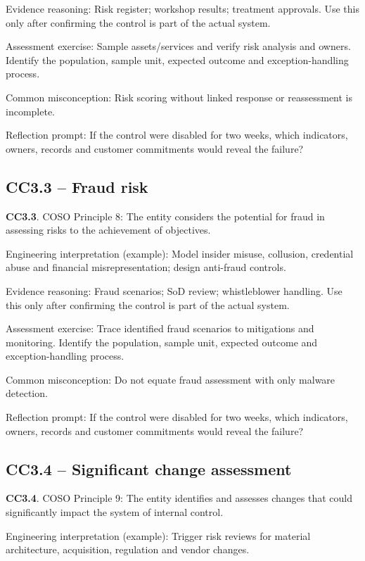 \documentclass[10pt,oneside]{report}
\begin{document}
Evidence reasoning: Risk register; workshop results; treatment approvals. Use this only after confirming the control is part of the actual system.

Assessment exercise: Sample assets/services and verify risk analysis and owners. Identify the population, sample unit, expected outcome and exception-handling process.

Common misconception: Risk scoring without linked response or reassessment is incomplete.

Reflection prompt: If the control were disabled for two weeks, which indicators, owners, records and customer commitments would reveal the failure?

\subsection{CC3.3 -- Fraud risk}
\begin{aicpabox}
\textbf{CC3.3}. COSO Principle 8: The entity considers the potential for fraud in assessing risks to the achievement of objectives.\par{}
\end{aicpabox}
Engineering interpretation (example): Model insider misuse, collusion, credential abuse and financial misrepresentation; design anti-fraud controls.

Evidence reasoning: Fraud scenarios; SoD review; whistleblower handling. Use this only after confirming the control is part of the actual system.

Assessment exercise: Trace identified fraud scenarios to mitigations and monitoring. Identify the population, sample unit, expected outcome and exception-handling process.

Common misconception: Do not equate fraud assessment with only malware detection.

Reflection prompt: If the control were disabled for two weeks, which indicators, owners, records and customer commitments would reveal the failure?

\subsection{CC3.4 -- Significant change assessment}
\begin{aicpabox}
\textbf{CC3.4}. COSO Principle 9: The entity identifies and assesses changes that could significantly impact the system of internal control.\par{}
\end{aicpabox}
Engineering interpretation (example): Trigger risk reviews for material architecture, acquisition, regulation and vendor changes.
\end{document}
